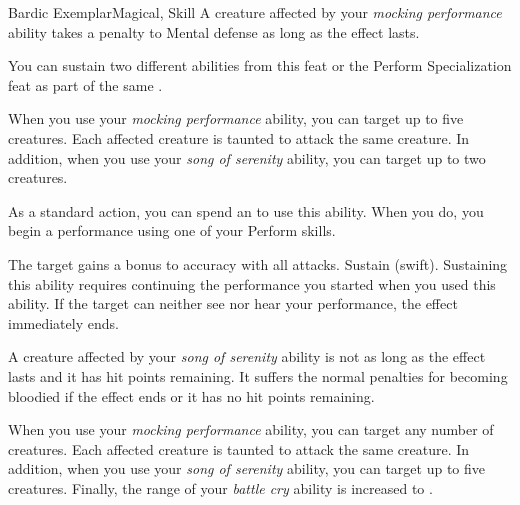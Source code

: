 \begin{feat}{Bardic Exemplar}{Magical, Skill}
         A creature affected by your \textit{mocking performance} ability takes a  penalty to Mental defense as long as the effect lasts.

         You can sustain two different  abilities from this feat or the Perform Specialization feat as part of the same .

         When you use your \textit{mocking performance} ability, you can target up to five creatures.
        Each affected creature is taunted to attack the same creature.
        In addition, when you use your \textit{song of serenity} ability, you can target up to two creatures.

         As a standard action, you can spend an  to use this ability.
        When you do, you begin a performance using one of your Perform skills.
        \begin{ability}
            \begin{spelltargetinginfo}
            \end{spelltargetinginfo}
            \begin{spelleffects}
                \spelleffect The target gains a  bonus to accuracy with all attacks.
                \spelldur Sustain (swift). Sustaining this ability requires continuing the performance you started when you used this ability. If the target can neither see nor hear your performance, the effect immediately ends.
            \end{spelleffects}
        \end{ability}

         A creature affected by your \textit{song of serenity} ability is not  as long as the effect lasts and it has hit points remaining.
        It suffers the normal penalties for becoming bloodied if the effect ends or it has no hit points remaining.

         When you use your \textit{mocking performance} ability, you can target any number of creatures.
        Each affected creature is taunted to attack the same creature.
        In addition, when you use your \textit{song of serenity} ability, you can target up to five creatures.
        Finally, the range of your \textit{battle cry} ability is increased to \rnglong.


\end{feat}
